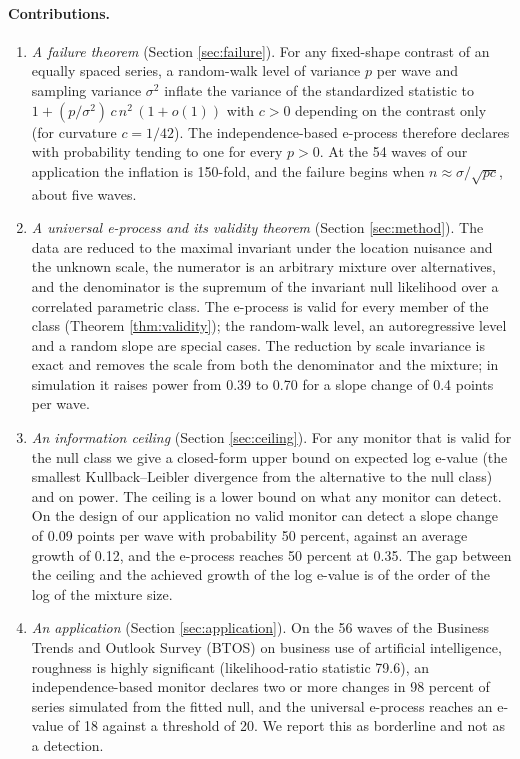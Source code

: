 \documentclass[11pt]{article}
\theoremstyle{plain}
\theoremstyle{definition}
\begin{document}
\paragraph{Contributions.}
\begin{enumerate}
\item \emph{A failure theorem} (Section \ref{sec:failure}). For any fixed-shape contrast of an equally spaced series, a random-walk level of variance $p$ per wave and sampling variance $\sigma^2$ inflate the variance of the standardized statistic to $1 + (p/\sigma^2)\,c\,n^2\,(1+o(1))$ with $c>0$ depending on the contrast only (for curvature $c = 1/42$). The independence-based e-process therefore declares with probability tending to one for every $p>0$. At the 54 waves of our application the inflation is 150-fold, and the failure begins when $n \approx \sigma/\sqrt{pc}$, about five waves.
\item \emph{A universal e-process and its validity theorem} (Section \ref{sec:method}). The data are reduced to the maximal invariant under the location nuisance and the unknown scale, the numerator is an arbitrary mixture over alternatives, and the denominator is the supremum of the invariant null likelihood over a correlated parametric class. The e-process is valid for every member of the class (Theorem \ref{thm:validity}); the random-walk level, an autoregressive level and a random slope are special cases. The reduction by scale invariance is exact and removes the scale from both the denominator and the mixture; in simulation it raises power from 0.39 to 0.70 for a slope change of 0.4 points per wave.
\item \emph{An information ceiling} (Section \ref{sec:ceiling}). For any monitor that is valid for the null class we give a closed-form upper bound on expected log e-value (the smallest Kullback--Leibler divergence from the alternative to the null class) and on power. The ceiling is a lower bound on what any monitor can detect. On the design of our application no valid monitor can detect a slope change of 0.09 points per wave with probability 50 percent, against an average growth of 0.12, and the e-process reaches 50 percent at 0.35. The gap between the ceiling and the achieved growth of the log e-value is of the order of the log of the mixture size.
\item \emph{An application} (Section \ref{sec:application}). On the 56 waves of the Business Trends and Outlook Survey (BTOS) on business use of artificial intelligence, roughness is highly significant (likelihood-ratio statistic 79.6), an independence-based monitor declares two or more changes in 98 percent of series simulated from the fitted null, and the universal e-process reaches an e-value of 18 against a threshold of 20. We report this as borderline and not as a detection.
\end{enumerate}
\end{document}
